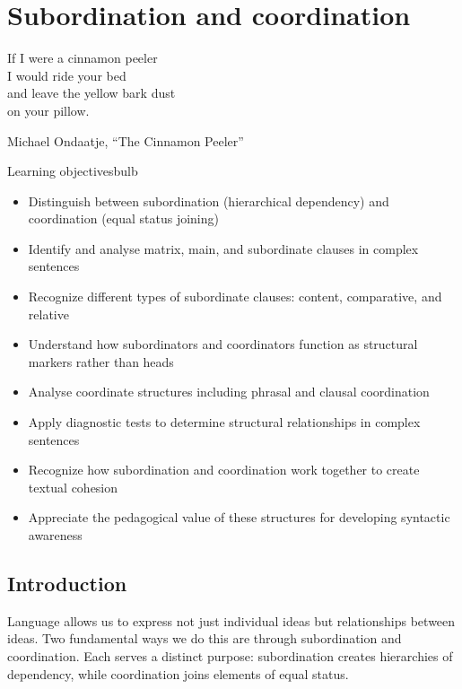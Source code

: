 \chapter{Subordination and coordination} \label{ch:subord-coord}

\epigraph{If I were a cinnamon peeler\\
I would ride your bed\\
and leave the yellow bark dust\\
on your pillow.}{Michael Ondaatje, \enquote{The Cinnamon Peeler}}

\begin{tblsframedsymbol}{Learning objectives}{bulb}
\begin{itemize}[noitemsep, leftmargin=*]
    \item Distinguish between subordination (hierarchical dependency) and coordination (equal status joining)
    \item Identify and analyse matrix, main, and subordinate clauses in complex sentences
    \item Recognize different types of subordinate clauses: content, comparative, and relative
    \item Understand how subordinators and coordinators function as structural markers rather than heads
    \item Analyse coordinate structures including phrasal and clausal coordination
    \item Apply diagnostic tests to determine structural relationships in complex sentences
    \item Recognize how subordination and coordination work together to create textual cohesion
    \item Appreciate the pedagogical value of these structures for developing syntactic awareness
\end{itemize}
\end{tblsframedsymbol}


\section{Introduction} 

Language allows us to express not just individual ideas but relationships between ideas. Two fundamental ways we do this are through subordination and coordination. Each serves a distinct purpose: subordination creates hierarchies of dependency, while coordination joins elements of equal status.

